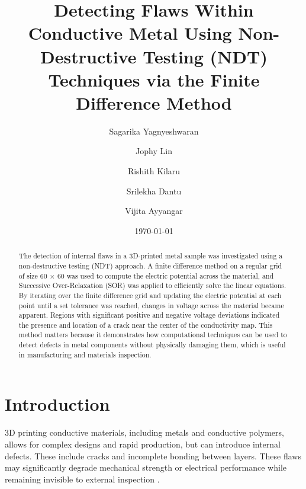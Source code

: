 \documentclass[reprint,amsmath,amssymb,aps]{revtex4-2}
\begin{document}
\title{Detecting Flaws Within Conductive Metal Using Non-Destructive Testing (NDT) Techniques via the Finite Difference Method}

\author{Sagarika Yagnyeshwaran}
\author{Jophy Lin}
\author{Rishith Kilaru}
\author{Srilekha Dantu}
\author{Vijita Ayyangar}

\date{\today}

\begin{abstract}

The detection of internal flaws in a 3D-printed metal sample was investigated using a non-destructive testing (NDT) approach. A finite difference method on a regular grid of size 60 $\times$ 60 was used to compute the electric potential across the material, and Successive Over-Relaxation (SOR) was applied to efficiently solve the linear equations. By iterating over the finite difference grid and updating the electric potential at each point until a set tolerance was reached, changes in voltage across the material became apparent. Regions with significant positive and negative voltage deviations indicated the presence and location of a crack near the center of the conductivity map. This method matters because it demonstrates how computational techniques can be used to detect defects in metal components without physically damaging them, which is useful in manufacturing and materials inspection.


\end{abstract}


\maketitle

\section{Introduction}

3D printing conductive materials, including metals and conductive polymers, allows for complex designs and rapid production, but can introduce internal defects. These include cracks and incomplete bonding between layers. These flaws may significantly degrade mechanical strength or electrical performance while remaining invisible to external inspection \cite{1}.
\end{document}
